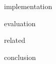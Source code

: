 \documentclass[12pt,a4paper,oneside]{article}
\begin{document}
\singlespacing

\onehalfspacing

\tableofcontents
\newpage









 {implementation}

 {evaluation}

 {related}

 {conclusion}



\end{document}
